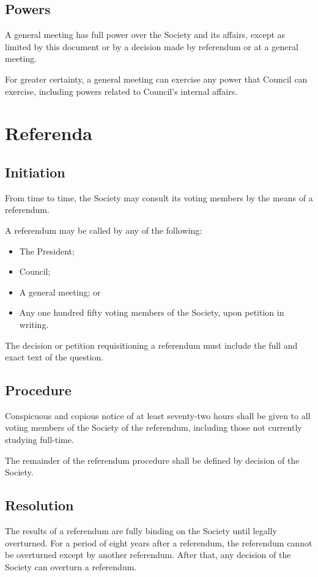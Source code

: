 \subsection{Powers}
A general meeting has full power over the Society and its affairs, except as
limited by this document or by a decision made by referendum or at a general
meeting.

For greater certainty, a general meeting can exercise any power that Council can
exercise, including powers related to Council's internal affairs.

\section{Referenda}
\subsection{Initiation}
From time to time, the Society may consult its voting members by the means of a
referendum.

A referendum may be called by any of the following:
\begin{itemize}
  \item The President;
  \item Council;
  \item A general meeting; or
  \item Any one hundred fifty voting members of the Society, upon petition in
    writing.
\end{itemize}

The decision or petition requisitioning a referendum must include the full and
exact text of the question.

\subsection{Procedure}
Conspicuous and copious notice of at least seventy-two hours shall be given to
all voting members of the Society of the referendum, including those not
currently studying full-time.

The remainder of the referendum procedure shall be defined by decision of the
Society.

\subsection{Resolution}
The results of a referendum are fully binding on the Society until legally
overturned. For a period of eight years after a referendum, the referendum
cannot be overturned except by another referendum. After that, any decision of
the Society can overturn a referendum.

